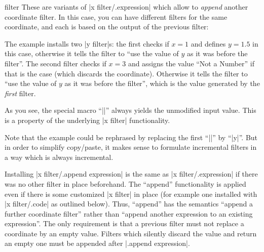 \begin{pgfplotsxyappendexpressionkeylist}{\x\space filter}
    These are variants of |x filter/.expression| which allow to \emph{append}
    another coordinate filter. In this case, you can have different filters for
    the same coordinate, and each is based on the output of the previous
    filter:
\begin{codeexample}[]
\end{codeexample}
    The example installs two |y filter|s: the first checks if $x = 1$ and
    defines $y=1.5$ in this case, otherwise it tells the filter to ``use the
    value of $y$ as it was before the filter''. The second filter checks if $x
    = 3$ and assigns the value ``Not a Number'' if that is the case (which
    discards the coordinate). Otherwise it tells the filter to ``use the value
    of $y$ as it was before the filter'', which is the value generated by the
    \emph{first} filter.

    As you see, the special macro ``|\pgfmathresult|'' always yields the
    unmodified input value. This is a property of the underlying |x filter|
    functionality.

    Note that the example could be rephrased by replacing the first
    ``|\pgfmathresult|'' by ``|y|''. But in order to simplify copy/paste, it
    makes sense to formulate incremental filters in a way which is always
    incremental.

    Installing |x filter/.append expression| is the same as
    |x filter/.expression| if there was no other filter in place beforehand.
    The ``append'' functionality is applied even if there is some customized
    |x filter| in place (for example one installed with |x filter/.code| as
    outlined below). Thus, ``append'' has the semantics ``append a further
    coordinate filter'' rather than ``append another expression to an existing
    expression''. The only requirement is that a previous filter must not
    replace a coordinate by an empty value. Filters which silently discard the
    value and return an empty one must be appended after |.append expression|.
\end{pgfplotsxyappendexpressionkeylist}

